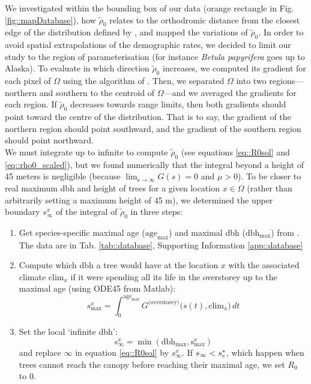 We investigated within the bounding box of our data (orange rectangle in Fig. \ref{fig::mapDatabase}), how $ \tilde \rho_0 $ relates to the orthodromic distance from the closest edge of the distribution defined by \citet{Little1971}, and mapped the variations of $ \tilde \rho_0 $. In order to avoid spatial extrapolations of the demographic rates, we decided to limit our study to the region of parameterisation (for instance \textit{Betula papyrifera} goes up to Alaska). To evaluate in which direction $ \tilde \rho_0 $ increases, we computed its gradient for each pixel of $ \Omega $ using the algorithm of \citet{Ritter1987}. Then, we separated $ \Omega $ into two regions---northern and southern to the centroid of $ \Omega $---and we averaged the gradients for each region. If $ \tilde \rho_0 $ decreases towards range limits, then both gradients should point toward the centre of the distribution. That is to say, the gradient of the northern region should point southward, and the gradient of the southern region should point northward. \\

We must integrate up to infinite to compute $ \tilde \rho_0 $ (see equations \eqref{eq::R0sol} and \eqref{eq::rho0_scaled}), but we found numerically that the integral beyond a height of 45 meters is negligible (because $ \lim_{\text{s} \to \infty} G(s) = 0 $ and $ \mu > 0 $). To be closer to real maximum dbh and height of trees for a given location $ x \in \Omega $ (rather than arbitrarily setting a maximum height of 45 m), we determined the upper boundary $ s_{\infty}^{x} $ of the integral of $ \tilde \rho_0 $ in three steps:
\begin{enumerate}
	\item Get species-specific maximal age ($ \text{age}_{\max} $) and maximal dbh ($ \text{dbh}_{\max} $) from \citet{Burns1990, Burns1990a}. The data are in Tab. \ref{tab::database}, Supporting Information \ref{app::database}
	\item Compute which dbh a tree would have at the location $ x $ with the associated climate $ \text{clim}_x $ if it were spending all its life in the overstorey up to the maximal age (using ODE45 from Matlab):
	\[
		s_{\max}^{x} = \int_0^{\text{age}_{\max}} G^{\text{(overstorey)}}\big(s(t), \text{clim}_x \big) \, dt
	\]
	\item Set the local `infinite dbh':
	\begin{equation} \label{eq::s_inf}
		s_{\infty}^{x} = \min(\text{dbh}_{\max}, \text{s}_{\max}^{x})
	\end{equation}
	and replace $ \infty $ in equation \eqref{eq::R0sol} by $ s_{\infty}^{x} $. If $ s_{\infty} < {s}^{*}_c $, which happen when trees cannot reach the canopy before reaching their maximal age, we set $ R_0 $ to 0.
\end{enumerate}


